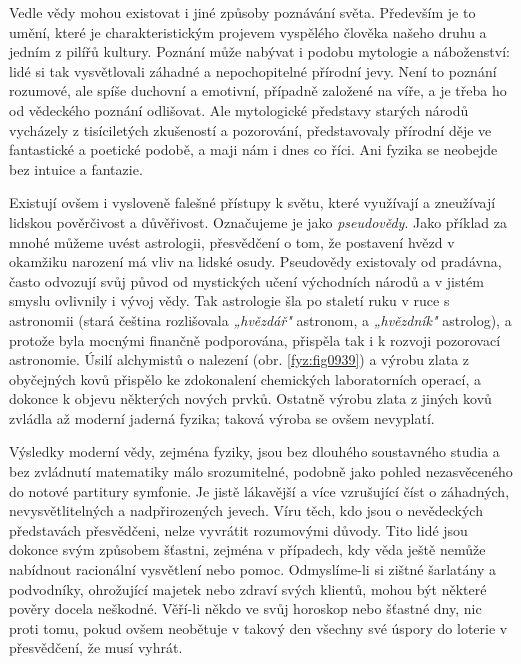       Vedle vědy mohou existovat i jiné způsoby poznávání světa. Především je to umění, které je
      charakteristickým projevem vyspělého člověka našeho druhu a jedním z pilířů kultury. Poznání
      může nabývat i podobu mytologie a náboženství: lidé si tak vysvětlovali záhadné a
      nepochopitelné přírodní jevy. Není to poznání rozumové, ale spíše duchovní a emotivní,
      případně založené na víře, a je třeba ho od vědeckého poznání odlišovat. Ale mytologické
      představy starých národů vycházely z tisíciletých zkušeností a pozorování, představovaly
      přírodní děje ve fantastické a poetické podobě, a maji nám i dnes co říci. Ani fyzika se
      neobejde bez intuice a fantazie.


      Existují ovšem i vysloveně falešné přístupy k světu, které využívají a zneužívají lidskou
      pověrčivost a důvěřivost. Označujeme je jako \emph{pseudovědy}. Jako příklad za mnohé můžeme
      uvést astrologii, přesvědčení o tom, že postavení hvězd v okamžiku narození má vliv na lidské
      osudy. Pseudovědy existovaly od pradávna, často odvozují svůj původ od mystických učení
      východních národů a v jistém smyslu ovlivnily i vývoj vědy. Tak astrologie šla po staletí ruku
      v ruce s astronomii (stará čeština rozlišovala \emph{„hvězdář"} astronom, a \emph{„hvězdník"}
      astrolog), a protože byla mocnými finančně podporována, přispěla tak i k rozvoji pozorovací
      astronomie. Úsilí alchymistů o nalezení \emph{} (obr. \ref{fyz:fig0939}) a
      výrobu zlata z obyčejných kovů přispělo ke zdokonalení chemických laboratorních operací, a
      dokonce k objevu některých nových prvků. Ostatně výrobu zlata z jiných kovů zvládla až moderní
      jaderná fyzika; taková výroba se ovšem nevyplatí.

      Výsledky moderní vědy, zejména fyziky, jsou bez dlouhého soustavného studia a bez zvládnutí
      matematiky málo srozumitelné, podobně jako pohled nezasvěceného do notové partitury symfonie.
      Je jistě lákavější a více vzrušující číst o záhadných, nevysvětlitelných a nadpřirozených
      jevech. Víru těch, kdo jsou o nevědeckých představách přesvědčeni, nelze vyvrátit rozumovými
      důvody. Tito lidé jsou dokonce svým způsobem šťastni, zejména v případech, kdy věda ještě
      nemůže nabídnout racionální vysvětlení nebo pomoc. Odmyslíme-li si zištné šarlatány a
      podvodníky, ohrožující majetek nebo zdraví svých klientů, mohou být některé pověry docela
      neškodné. Věří-li někdo ve svůj horoskop nebo šťastné dny, nic proti tomu, pokud ovšem
      neobětuje v takový den všechny své úspory do loterie v přesvědčení, že musí vyhrát.


